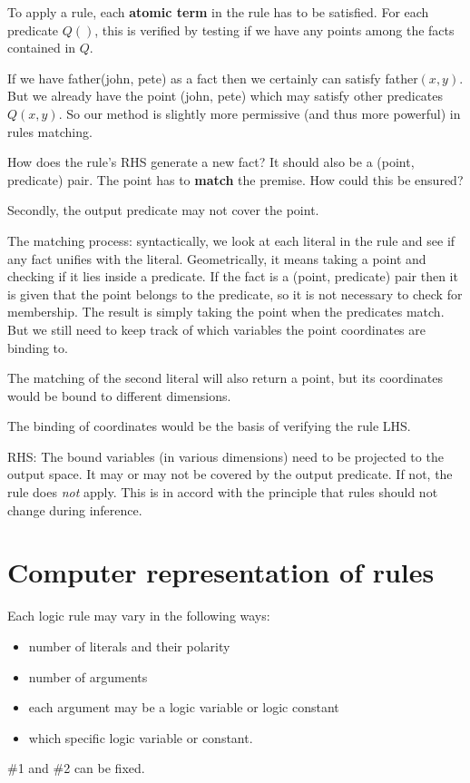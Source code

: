 To apply a rule, each \textbf{atomic term} in the rule has to be satisfied.  For each predicate $Q()$, this is verified by testing if we have any points among the facts contained in $Q$.

If we have \textsf{father(john, pete)} as a fact then we certainly can satisfy \textsf{father}$(x,y)$.  But we already have the point \textsf{(john, pete)} which may satisfy other predicates $Q(x,y)$.  So our method is slightly more permissive (and thus more powerful) in rules matching.

How does the rule's RHS generate a new fact?  It should also be a (point, predicate) pair.  The point has to \textbf{match} the premise.  How could this be ensured?

Secondly, the output predicate may not cover the point.

The matching process:  syntactically, we look at each literal in the rule and see if any fact unifies with the literal.  Geometrically, it means taking a point and checking if it lies inside a predicate.  If the fact is a (point, predicate) pair then it is given that the point belongs to the predicate, so it is not necessary to check for membership.  The result is simply taking the point when the predicates match.  But we still need to keep track of which variables the point coordinates are binding to.

The matching of the second literal will also return a point, but its coordinates would be bound to different dimensions.  

The binding of coordinates would be the basis of verifying the rule LHS.

RHS:  The bound variables (in various dimensions) need to be projected to the output space.  It may or may not be covered by the output predicate.  If not, the rule does \textit{not} apply.  This is in accord with the principle that rules should not change during inference.

\section{Computer representation of rules}

Each logic rule may vary in the following ways:
\begin{itemize}
	\item number of literals and their polarity
	\item number of arguments
	\item each argument may be a logic variable or logic constant
	\item which specific logic variable or constant.
\end{itemize}
\#1 and \#2 can be fixed.

